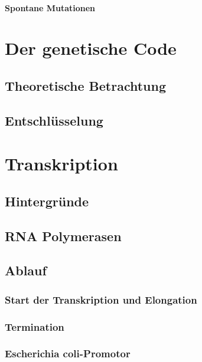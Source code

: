 \paragraph{Spontane Mutationen}

\section{Der genetische Code}\label{sec:der-genetische-code}

\subsection{Theoretische Betrachtung}\label{subsec:theoretische-betrachtung}
\subsection{Entschlüsselung}\label{subsec:entschlusselung}


\section{Transkription}\label{sec:transkription}

\subsection*{Hintergründe}
\subsection{RNA Polymerasen}\label{subsec:rna-polymerasen}
\subsection{Ablauf}\label{subsec:ablauf}
\subsubsection{Start der Transkription und Elongation}

\subsubsection{Termination}

\subsubsection{Escherichia coli-Promotor}


